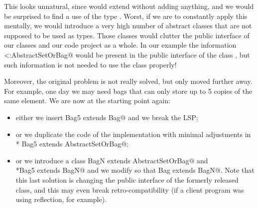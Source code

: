 This looks unnatural, since \Q@Set@ would extend \Q@AbstractSetOrBag@ without adding anything,
and we would be surprised to find a use of the type \Q@AbstractSetOrBag@.
Worst, if we are to constantly apply this mentally, we would introduce a very high number
of abstract classes that are not supposed to be used as types. Those classes would clutter the 
public interface of our classes and our code project as a whole.
In our example the information \Q@Set<:AbstractSetOrBag@ would be present in the public interface
of the class \Q@Set@, but such information is not needed to use the class properly!

Moreover, the original problem is not really solved, but only moved 
further away. For example, one day  we may need bags that can only store up to 5 copies of the same element.
We are now at the starting point again:
\begin{itemize}
\item either we insert \Q@class Bag5 extends Bag@ and we break the LSP; 
\item or we duplicate the code of the \Q@Bag@ implementation with minimal
  adjustments in \\* \Q@class Bag5 extends AbstractSetOrBag@;
\item or we introduce a
\Q@abstract class BagN extends AbstractSetOrBag@ and \\*\Q@class Bag5 extends BagN@
and we modify \Q@Bag@ so that  \Q@class Bag extends BagN@.
Note that this last solution is changing the public interface of the formerly released \Q@Bag@ class, and
this may even break retro-compatibility (if a client program was using
reflection, for example).
\end{itemize}

